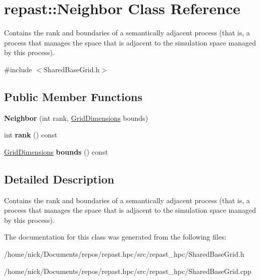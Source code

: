 \hypertarget{classrepast_1_1_neighbor}{\section{repast\-:\-:Neighbor Class Reference}
\label{classrepast_1_1_neighbor}
}


Contains the rank and boundaries of a semantically adjacent process (that is, a process that manages the space that is adjacent to the simulation space managed by this process).  




{\ttfamily \#include $<$Shared\-Base\-Grid.\-h$>$}

\subsection*{Public Member Functions}
\begin{DoxyCompactItemize}
\item 
\hypertarget{classrepast_1_1_neighbor_a7063a662d4342a523b2716ae9100da67}{{\bfseries Neighbor} (int rank, \hyperlink{classrepast_1_1_grid_dimensions}{Grid\-Dimensions} bounds)}\label{classrepast_1_1_neighbor_a7063a662d4342a523b2716ae9100da67}

\item 
\hypertarget{classrepast_1_1_neighbor_a09114073766153e1a5e596fd0eba0734}{int {\bfseries rank} () const }\label{classrepast_1_1_neighbor_a09114073766153e1a5e596fd0eba0734}

\item 
\hypertarget{classrepast_1_1_neighbor_ab49a3e501a9a6765bde278c48fe41ae0}{\hyperlink{classrepast_1_1_grid_dimensions}{Grid\-Dimensions} {\bfseries bounds} () const }\label{classrepast_1_1_neighbor_ab49a3e501a9a6765bde278c48fe41ae0}

\end{DoxyCompactItemize}


\subsection{Detailed Description}
Contains the rank and boundaries of a semantically adjacent process (that is, a process that manages the space that is adjacent to the simulation space managed by this process). 

The documentation for this class was generated from the following files\-:\begin{DoxyCompactItemize}
\item 
/home/nick/\-Documents/repos/repast.\-hpc/src/repast\-\_\-hpc/Shared\-Base\-Grid.\-h\item 
/home/nick/\-Documents/repos/repast.\-hpc/src/repast\-\_\-hpc/Shared\-Base\-Grid.\-cpp\end{DoxyCompactItemize}
